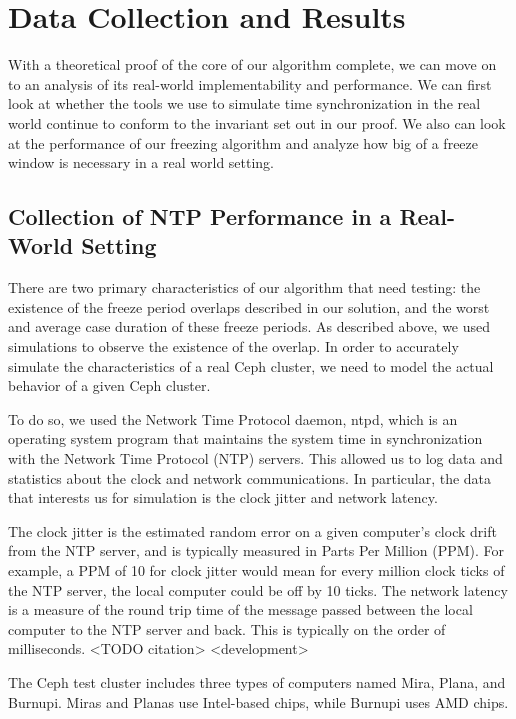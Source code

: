 \chapter{Data Collection and Results}
\label{sec:data-res}


With a theoretical proof of the core of our algorithm complete, we can
move on to an analysis of its real-world implementability and
performance. We can first look at whether the tools we use to simulate
time synchronization in the real world continue to conform to the
invariant set out in our proof. We also can look at the performance of
our freezing algorithm and analyze how big of a freeze window is
necessary in a real world setting.

\section{Collection of NTP Performance in a Real-World Setting}

There are two primary characteristics of our algorithm that need
testing: the existence of the freeze period overlaps described in our
solution, and the worst and average case duration of these freeze
periods. As described above, we used simulations to observe the
existence of the overlap. In order to accurately simulate the
characteristics of a real Ceph cluster, we need to model the actual
behavior of a given Ceph cluster.

To do so, we used the Network Time Protocol daemon, ntpd, which is an
operating system program that maintains the system time in
synchronization with the Network Time Protocol (NTP) servers. This
allowed us to log data and statistics about the clock and network
communications. In particular, the data that interests us for
simulation is the clock jitter and network latency.

The clock jitter is the estimated random error on a given computer’s
clock drift from the NTP server, and is typically measured in Parts
Per Million (PPM). For example, a PPM of 10 for clock jitter would
mean for every million clock ticks of the NTP server, the local
computer could be off by 10 ticks. The network latency is a measure of
the round trip time of the message passed between the local computer
to the NTP server and back. This is typically on the order of
milliseconds. <TODO citation> <development>

The Ceph test cluster includes three types of computers named Mira,
Plana, and Burnupi. Miras and Planas use Intel-based chips, while
Burnupi uses AMD chips.

